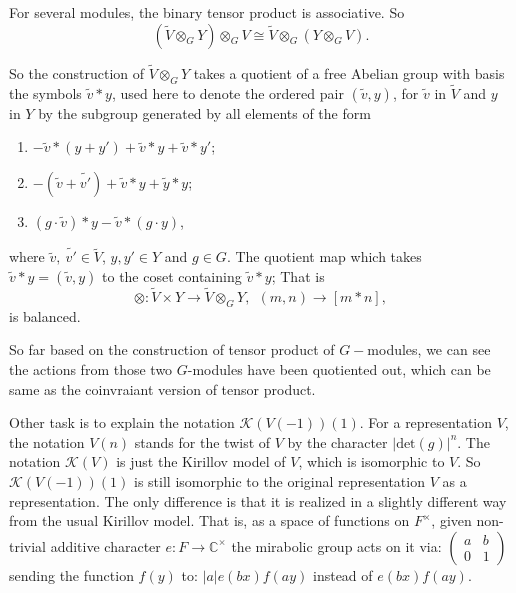\documentclass[12pt,a4paper,english]{article}
\theoremstyle{plain}
\theoremstyle{definition}
\begin{document}
For several modules, the binary tensor product is associative. So 
\begin{equation*}
    (\tilde{V}\otimes_{G}Y)\otimes_{G}V\cong \tilde{V}\otimes_{G}(Y\otimes_{G} V).
\end{equation*}

So the construction of $\tilde{V}\otimes_{G}Y$ takes a quotient of a free Abelian group with basis the symbols $\tilde{v}*y$, used here to denote the ordered pair $(\tilde{v}, y)$, for $\tilde{v}$ in $\tilde{V}$ and $y$ in $Y$ by the subgroup generated by all elements of the form
\begin{enumerate}
    \item $-\tilde{v}*(y+y')+\tilde{v}*y+\tilde{v}*y'$;
    \item 
    $-(\tilde{v}+\tilde{v'})+\tilde{v}*y+\tilde{y}*y$;
    \item $(g\cdot \tilde{v})*y-\tilde{
    v}*(g\cdot y)$,
\end{enumerate}
where $\tilde{v},\ \tilde{v'}\in \tilde{V}$, $y,y'\in Y$ and $g\in G$. The quotient map which takes $\tilde{v}*y=(\tilde{v}, y)$ to the coset containing $\tilde{v}*y$; That is 
\begin{equation*}
    \otimes : \tilde{V}\times Y\rightarrow \tilde{V}\otimes_{G} Y,\ \ (m,n )\rightarrow [m*n], 
\end{equation*}
is balanced.

So far based on the construction of tensor product of $G-$modules, we can see the actions from those two $G$-modules have been quotiented out, which can be same as the coinvraiant version of tensor product.













Other task is to explain the notation $\mathcal{K}(V(-1))(1)$.  For a representation $V$, the notation $V(n)$ stands for the twist of $V$ by the character $|\text{det}(g)|^n$.
The notation $\mathcal{K}(V)$ is just the Kirillov model of $V$, which is isomorphic to $V$.
So $\mathcal{K}(V(-1))(1)$ is still isomorphic to the original representation $V$ as a representation. The only difference is that it is realized in a slightly different way from the usual Kirillov model. That is, as a space of functions on $F^\times$, given non-trivial additive character $e:F\rightarrow  \mathbb{C}^{\times}$ the mirabolic group acts on it via:
$\begin{pmatrix} 
a & b \\ 
0 & 1 
\end{pmatrix}$
sending the function $f(y)$ to:
$|a| e(bx) f(ay)$
instead of $e(bx) f(ay)$.
\end{document}
